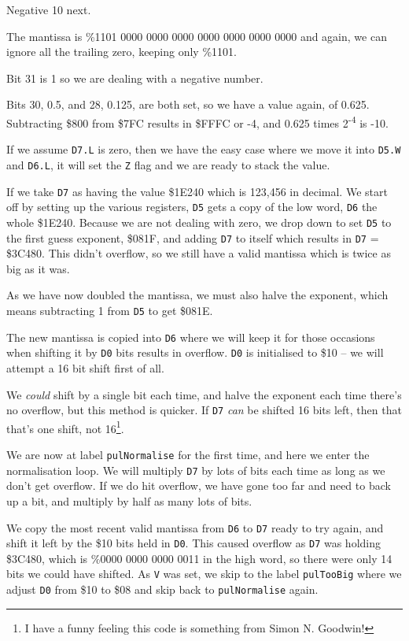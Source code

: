 Negative 10 next.

The mantissa is \%1101 0000 0000 0000 0000 0000 0000 0000 and again,
we can ignore all the trailing zero, keeping only \%1101.

Bit 31 is 1 so we are dealing with a negative number.

Bits 30, 0.5, and 28, 0.125, are both set, so we have a value again,
of 0.625. Subtracting \$800 from \$7FC results in \$FFFC or -4, and
0.625 times 2\textsuperscript{-4} is -10. 

If we assume \texttt{D7.L} is zero, then we have the easy case where
we move it into \texttt{D5.W} and \texttt{D6.L}, it will set the \texttt{Z}
flag and we are ready to stack the value.

If we take \texttt{D7} as having the value \$1E240 which is 123,456
in decimal. We start off by setting up the various registers, \texttt{D5}
gets a copy of the low word, \texttt{D6} the whole \$1E240. Because
we are not dealing with zero, we drop down to set \texttt{D5} to the
first guess exponent, \$081F, and adding \texttt{D7} to itself which
results in \texttt{D7} = \$3C480. This didn't overflow, so we still
have a valid mantissa which is twice as big as it was.

As we have now doubled the mantissa, we must also halve the exponent,
which means subtracting 1 from \texttt{D5} to get \$081E.

The new mantissa is copied into \texttt{D6} where we will keep it
for those occasions when shifting it by \texttt{D0} bits results in
overflow. \texttt{D0} is initialised to \$10 -- we will attempt a
16 bit shift first of all.

We \emph{could} shift by a single bit each time, and halve the exponent
each time there's no overflow, but this method is quicker. If \texttt{D7}
\emph{can} be shifted 16 bits left, then that that's one shift, not
16\footnote{I have a funny feeling this code is something from Simon N. Goodwin!}.

We are now at label \texttt{pulNormalise} for the first time, and
here we enter the normalisation loop. We will multiply \texttt{D7}
by \textquotedbl lots of bits\textquotedbl{} each time as long as we
don't get overflow. If we do hit overflow, we have gone too far and
need to back up a bit, and multiply by half as many \textquotedbl lots
of bits\textquotedbl .

We copy the most recent valid mantissa from \texttt{D6} to \texttt{D7}
ready to try again, and shift it left by the \$10 bits held in \texttt{D0}.
This caused overflow as \texttt{D7} was holding \$3C480, which is
\%0000 0000 0000 0011 in the high word, so there were only 14 bits
we could have shifted. As \texttt{V} was set, we skip to the label
\texttt{pulTooBig} where we adjust \texttt{D0} from \$10 to \$08 and
skip back to \texttt{pulNormalise} again.

